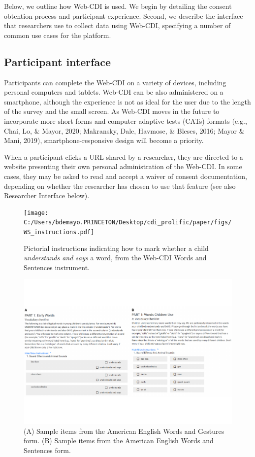 \documentclass[
  english,
  ,man,floatsintext]{apa6}
\begin{document}
Below, we outline how Web-CDI is used. We begin by detailing the consent obtention process and participant experience. Second, we describe the interface that researchers use to collect data using Web-CDI, specifying a number of common use cases for the platform.

\hypertarget{participant-interface}{%
\subsection{Participant interface}\label{participant-interface}}

Participants can complete the Web-CDI on a variety of devices, including personal computers and tablets. Web-CDI can be also administered on a smartphone, although the experience is not as ideal for the user due to the length of the survey and the small screen. As Web-CDI moves in the future to incorporate more short forms and computer adaptive tests (CATs) formats (e.g., Chai, Lo, \& Mayor, 2020; Makransky, Dale, Havmose, \& Bleses, 2016; Mayor \& Mani, 2019), smartphone-responsive design will become a priority.

When a participant clicks a URL shared by a researcher, they are directed to a website presenting their own personal administration of the Web-CDI. In some cases, they may be asked to read and accept a waiver of consent documentation, depending on whether the researcher has chosen to use that feature (see also Researcher Interface below).

\begin{figure}
\centering
\texttt{[image: C:/Users/bdemayo.PRINCETON/Desktop/cdi\_prolific/paper/figs/WS\_instructions.pdf]}
\caption{\label{fig:pictorial}Pictorial instructions indicating how to mark whether a child \emph{understands and says} a word, from the Web-CDI Words and Sentences instrument.}
\end{figure}

\begin{figure}
\centering
\includegraphics{webcdi_paper_files/figure-latex/firstitems-1.pdf}
\caption{\label{fig:firstitems}(A) Sample items from the American English Words and Gestures form. (B) Sample items from the American English Words and Sentences form.}
\end{figure}
\end{document}
